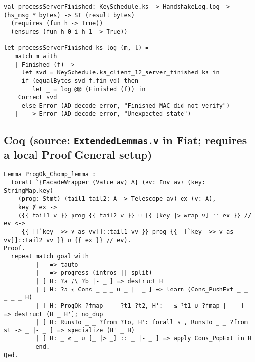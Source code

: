\documentclass{article}
\begin{document}
\begin{verbatim}
val processServerFinished: KeySchedule.ks -> HandshakeLog.log -> (hs_msg * bytes) -> ST (result bytes)
  (requires (fun h -> True))
  (ensures (fun h_0 i h_1 -> True))

let processServerFinished ks log (m, l) =
   match m with
   | Finished (f) ->
     let svd = KeySchedule.ks_client_12_server_finished ks in
     if (equalBytes svd f.fin_vd) then
        let _ = log @@ (Finished (f)) in
    Correct svd
     else Error (AD_decode_error, "Finished MAC did not verify")
   | _ -> Error (AD_decode_error, "Unexpected state")
\end{verbatim}

\subsection*{Coq (source: \texttt{ExtendedLemmas.v} in Fiat; requires a local Proof General setup)}

\begin{verbatim}
Lemma ProgOk_Chomp_lemma :
  forall `{FacadeWrapper (Value av) A} (ev: Env av) (key: StringMap.key)
    (prog: Stmt) (tail1 tail2: A -> Telescope av) ex (v: A),
    key ∉ ex ->
    ({{ tail1 v }} prog {{ tail2 v }} ∪ {{ [key |> wrap v] :: ex }} // ev <->
     {{ [[`key ->> v as vv]]::tail1 vv }} prog {{ [[`key ->> v as vv]]::tail2 vv }} ∪ {{ ex }} // ev).
Proof.
  repeat match goal with
         | _ => tauto
         | _ => progress (intros || split)
         | [ H: ?a /\ ?b |- _ ] => destruct H
         | [ H: ?a ≲ Cons _ _ _ ∪ _ |- _ ] => learn (Cons_PushExt _ _ _ _ _ H)
         | [ H: ProgOk ?fmap _ _ ?t1 ?t2, H': _ ≲ ?t1 ∪ ?fmap |- _ ] => destruct (H _ H'); no_dup
         | [ H: RunsTo _ _ ?from ?to, H': forall st, RunsTo _ _ ?from st -> _ |- _ ] => specialize (H' _ H)
         | [ H: _ ≲ _ ∪ [_ |> _] :: _ |- _ ] => apply Cons_PopExt in H
         end.
Qed.
\end{verbatim}
\end{document}
